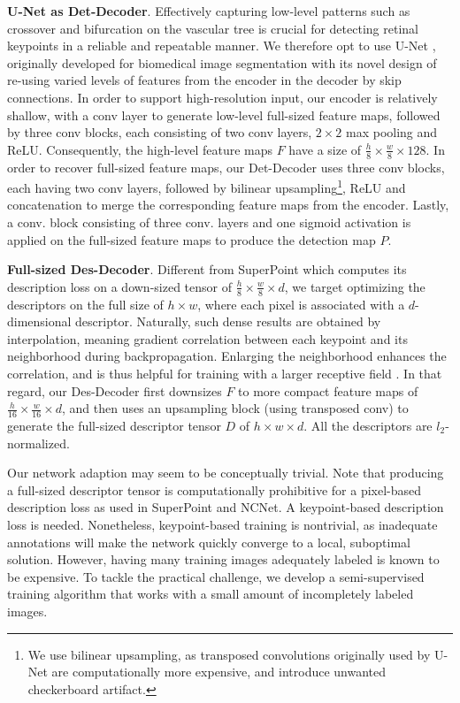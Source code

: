 \textbf{U-Net as Det-Decoder}. 
Effectively capturing low-level patterns such as crossover and bifurcation on the vascular tree is crucial for detecting retinal keypoints in a reliable and repeatable manner. We therefore opt to use U-Net \cite{ronneberger2015u}, originally developed for biomedical image segmentation with its novel design of re-using varied levels of features from the encoder in the decoder by skip connections. In order to support high-resolution input, our encoder is relatively shallow, with a conv layer to generate low-level full-sized feature maps, followed by three conv blocks, each consisting of two conv layers, $2\times2$ max pooling and ReLU. Consequently, the high-level feature maps $F$ have a size of $\frac{h}{8} \times \frac{w}{8} \times 128$.  In order to recover full-sized feature maps, our Det-Decoder uses three conv blocks, each having two conv layers, followed by bilinear upsampling\footnote{We use bilinear upsampling, as transposed convolutions originally used by U-Net are  computationally more expensive, and introduce unwanted checkerboard artifact\cite{M2U-Net}.}, ReLU and concatenation to merge the corresponding feature maps from the encoder. Lastly, a conv. block consisting of three conv. layers and one sigmoid activation is applied on the full-sized feature maps to produce the  detection map $P$. 




\textbf{Full-sized Des-Decoder}.
Different from SuperPoint which computes its description loss on a down-sized tensor of $\frac{h}{8} \times \frac{w}{8} \times d$, we target optimizing the descriptors on the full size of $h \times w$, where each pixel is associated with a $d$-dimensional descriptor. Naturally, such dense results are obtained by interpolation, meaning gradient correlation between each keypoint and its neighborhood during backpropagation. Enlarging the neighborhood enhances the correlation, and is thus helpful for training with a larger receptive field \cite{chen2017deeplab}. In that regard, our Des-Decoder first downsizes $F$ to more compact feature maps of $\frac{h}{16}\times \frac{w}{16}\times d$, and then uses an upsampling block (using transposed conv) to generate the full-sized descriptor tensor $D$ of $h \times w \times d$. All the descriptors are $l_2$-normalized.

Our network adaption may seem to be conceptually trivial. Note that producing a full-sized descriptor tensor is computationally prohibitive for a pixel-based description loss as used in SuperPoint and NCNet. A keypoint-based description loss is needed. Nonetheless, keypoint-based training is nontrivial, as inadequate annotations will make the network quickly converge to a local, suboptimal solution. However, having many training images adequately labeled is known to be expensive. To tackle the practical challenge, we develop a semi-supervised training algorithm that works with a small amount of incompletely labeled images.



